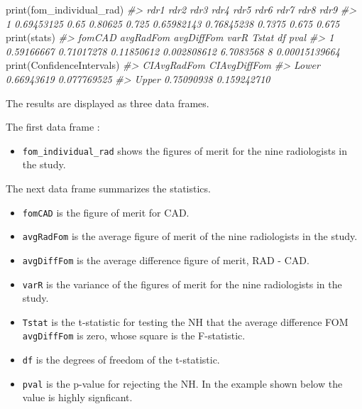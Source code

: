 \documentclass[
]{book}
\newenvironment{Shaded}{\begin{snugshade}}{\end{snugshade}}
\newcommand{\CommentTok}[1]{\textcolor[rgb]{0.56,0.35,0.01}{\textit{#1}}}
\newcommand{\FunctionTok}[1]{\textcolor[rgb]{0.00,0.00,0.00}{#1}}
\newcommand{\NormalTok}[1]{#1}
\providecommand{\tightlist}{%
  \setlength{\itemsep}{0pt}\setlength{\parskip}{0pt}}
\begin{document}
\begin{Shaded}
\begin{Highlighting}[]
\FunctionTok{print}\NormalTok{(fom\_individual\_rad)}
\CommentTok{\#\textgreater{}         rdr1 rdr2    rdr3  rdr4       rdr5       rdr6   rdr7  rdr8  rdr9}
\CommentTok{\#\textgreater{} 1 0.69453125 0.65 0.80625 0.725 0.65982143 0.76845238 0.7375 0.675 0.675}
\FunctionTok{print}\NormalTok{(stats)}
\CommentTok{\#\textgreater{}       fomCAD  avgRadFom avgDiffFom        varR     Tstat df          pval}
\CommentTok{\#\textgreater{} 1 0.59166667 0.71017278 0.11850612 0.002808612 6.7083568  8 0.00015139664}
\FunctionTok{print}\NormalTok{(ConfidenceIntervals)}
\CommentTok{\#\textgreater{}       CIAvgRadFom CIAvgDiffFom}
\CommentTok{\#\textgreater{} Lower  0.66943619  0.077769525}
\CommentTok{\#\textgreater{} Upper  0.75090938  0.159242710}
\end{Highlighting}
\end{Shaded}

The results are displayed as three data frames.

The first data frame :

\begin{itemize}
\tightlist
\item
  \texttt{fom\_individual\_rad} shows the figures of merit for the nine radiologists in the study.
\end{itemize}

The next data frame summarizes the statistics.

\begin{itemize}
\tightlist
\item
  \texttt{fomCAD} is the figure of merit for CAD.
\item
  \texttt{avgRadFom} is the average figure of merit of the nine radiologists in the study.
\item
  \texttt{avgDiffFom} is the average difference figure of merit, RAD - CAD.
\item
  \texttt{varR} is the variance of the figures of merit for the nine radiologists in the study.
\item
  \texttt{Tstat} is the t-statistic for testing the NH that the average difference FOM \texttt{avgDiffFom} is zero, whose square is the F-statistic.
\item
  \texttt{df} is the degrees of freedom of the t-statistic.
\item
  \texttt{pval} is the p-value for rejecting the NH. In the example shown below the value is highly signficant.
\end{itemize}
\end{document}

